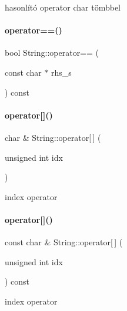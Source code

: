 hasonlító operator char tömbbel 

\mbox{\label{class_string_aa50c56cbbbc9956cb359a7617f13809b}} 
\paragraph{\texorpdfstring{operator==()}{operator==()}\hspace{0.1cm}{\footnotesize\ttfamily [4/4]}}
{\footnotesize\ttfamily bool String\+::operator== (\begin{DoxyParamCaption}\item[{const char $\ast$}]{rhs\+\_\+s }\end{DoxyParamCaption}) const}

\mbox{\label{class_string_a1a7c5c39d4dafbbf8516f5058a253f1a}} 
\paragraph{\texorpdfstring{operator[]()}{operator[]()}\hspace{0.1cm}{\footnotesize\ttfamily [1/2]}}
{\footnotesize\ttfamily char \& String\+::operator\mbox{[}$\,$\mbox{]} (\begin{DoxyParamCaption}\item[{unsigned int}]{idx }\end{DoxyParamCaption})}



index operator 

\mbox{\label{class_string_aaa249e62641872197679cfc7c66118c0}} 
\paragraph{\texorpdfstring{operator[]()}{operator[]()}\hspace{0.1cm}{\footnotesize\ttfamily [2/2]}}
{\footnotesize\ttfamily const char \& String\+::operator\mbox{[}$\,$\mbox{]} (\begin{DoxyParamCaption}\item[{unsigned int}]{idx }\end{DoxyParamCaption}) const}



index operator 


